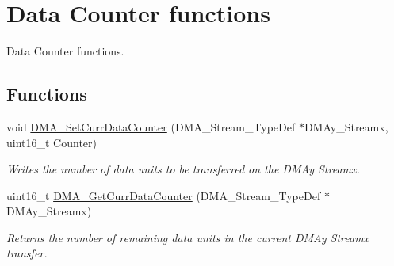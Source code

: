 \hypertarget{group___d_m_a___group2}{\section{Data Counter functions}
\label{group___d_m_a___group2}
}


Data Counter functions.  


\subsection*{Functions}
\begin{DoxyCompactItemize}
\item 
void \hyperlink{group___d_m_a___group2_ga6a11a2c951cff59b125ba8857d44e3f3}{D\-M\-A\-\_\-\-Set\-Curr\-Data\-Counter} (D\-M\-A\-\_\-\-Stream\-\_\-\-Type\-Def $\ast$D\-M\-Ay\-\_\-\-Streamx, uint16\-\_\-t Counter)
\begin{DoxyCompactList}\small\item\em Writes the number of data units to be transferred on the D\-M\-Ay Streamx. \end{DoxyCompactList}\item 
uint16\-\_\-t \hyperlink{group___d_m_a___group2_ga4a76444a92423f5f15a4328738d6dc46}{D\-M\-A\-\_\-\-Get\-Curr\-Data\-Counter} (D\-M\-A\-\_\-\-Stream\-\_\-\-Type\-Def $\ast$D\-M\-Ay\-\_\-\-Streamx)
\begin{DoxyCompactList}\small\item\em Returns the number of remaining data units in the current D\-M\-Ay Streamx transfer. \end{DoxyCompactList}\end{DoxyCompactItemize}


